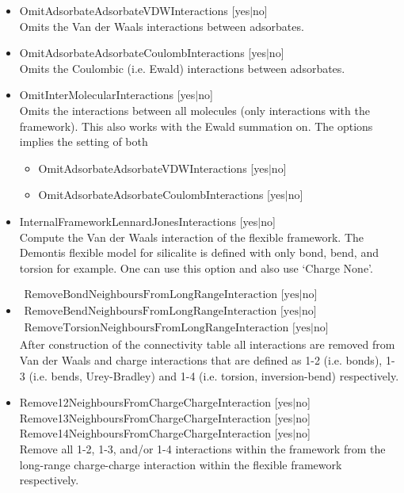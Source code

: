 \begin{itemize}
\item{OmitAdsorbateAdsorbateVDWInteractions [yes$|$no]}\\
Omits the Van der Waals interactions between adsorbates.
\item{OmitAdsorbateAdsorbateCoulombInteractions [yes$|$no]}\\
Omits the Coulombic (i.e. Ewald) interactions between adsorbates.
\item{OmitInterMolecularInteractions [yes$|$no]}\\
Omits the interactions between all molecules (only interactions with the framework). This also
works with the Ewald summation on. The options implies the setting of both
\begin{itemize}
  \item{OmitAdsorbateAdsorbateVDWInteractions [yes$|$no]}
  \item{OmitAdsorbateAdsorbateCoulombInteractions [yes$|$no]}
\end{itemize}
\item{InternalFrameworkLennardJonesInteractions [yes$|$no]}\\
Compute the Van der Waals interaction of the flexible framework. The Demontis flexible model for silicalite
is defined with only bond, bend, and torsion for example. One can use this option and also use
`Charge None'.
\item{$\begin{array}{l}\text{RemoveBondNeighboursFromLongRangeInteraction [yes$|$no]}\\
      \text{RemoveBendNeighboursFromLongRangeInteraction [yes$|$no]}\\
      \text{RemoveTorsionNeighboursFromLongRangeInteraction [yes$|$no]}\end{array}$}\\
After construction of the connectivity table all interactions are removed from Van der Waals and charge
interactions that are defined as 1-2 (i.e. bonds), 1-3 (i.e. bends, Urey-Bradley) and 1-4 (i.e. torsion, inversion-bend) respectively.
\item{Remove12NeighboursFromChargeChargeInteraction [yes$|$no]\\
      Remove13NeighboursFromChargeChargeInteraction [yes$|$no]\\
      Remove14NeighboursFromChargeChargeInteraction [yes$|$no]}\\
Remove all 1-2, 1-3, and/or 1-4 interactions within the framework from the long-range charge-charge
interaction within the flexible framework respectively.

\end{itemize}
